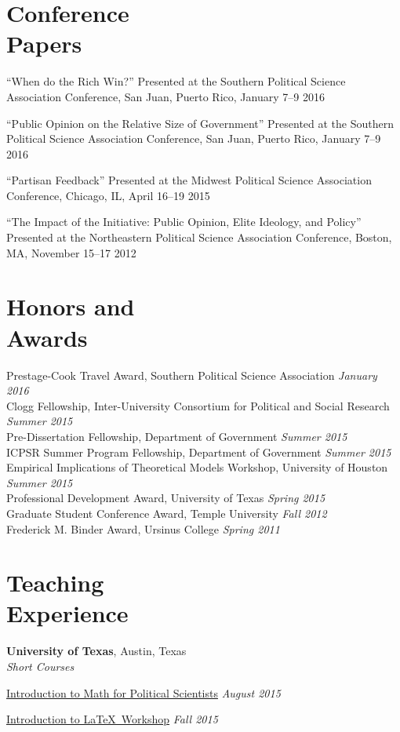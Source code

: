 \documentclass[margin,line]{res}
\newenvironment{list2}{
    \begin{list}{--}{%
        \setlength{\itemsep}{0in}
        \setlength{\parsep}{0in} \setlength{\parskip}{0in}
        \setlength{\topsep}{0in} \setlength{\partopsep}{0in}
        \setlength{\leftmargin}{0.2in}}}{\end{list}}
\begin{document}
\begin{resume}
\section{\sc Conference\\Papers}
\begin{list2}
\item ``When do the Rich Win?'' Presented at the Southern Political
  Science Association Conference, San Juan, Puerto Rico, January 7--9 2016
\item ``Public Opinion on the Relative Size of Government'' Presented
  at the Southern Political Science Association Conference, San Juan,
  Puerto Rico, January 7--9 2016
\item ``Partisan Feedback'' Presented at the Midwest Political Science
  Association Conference, Chicago, IL, April 16--19 2015
\item ``The Impact of the Initiative: Public Opinion, Elite Ideology,
  and Policy'' Presented at the Northeastern Political Science
  Association Conference, Boston, MA, November 15--17 2012
\end{list2}

\section{\sc Honors and \\Awards}
Prestage-Cook Travel Award, Southern Political Science Association
\hfill \emph{January 2016} \\
Clogg Fellowship, Inter-University Consortium for Political and Social
Research \hfill \emph{Summer 2015} \\
Pre-Dissertation Fellowship, Department of Government \hfill \emph{Summer 2015} \\
ICPSR Summer Program Fellowship, Department of Government \hfill \emph{Summer 2015} \\
Empirical Implications of Theoretical Models Workshop, University of Houston  \hfill \emph{Summer 2015} \\
Professional Development Award, University of Texas \hfill \emph{Spring 2015} \\
Graduate Student Conference Award, Temple University \hfill \emph{Fall 2012} \\
Frederick M. Binder Award, Ursinus College \hfill \emph{Spring 2011} %

\section{\sc Teaching \\Experience}
\textbf{University of Texas}, Austin, Texas  \\
\emph{Short Courses}
\begin{list2}
\item
  \href{https://github.com/jabranham/math-camp}{Introduction
    to Math for Political Scientists} \hfill \emph{August
    2015}
\item
  \href{https://github.com/jabranham/latex-workshop}{Introduction
    to \LaTeX~Workshop} \hfill \emph{Fall 2015}
\end{list2}


\end{resume}
\end{document}
